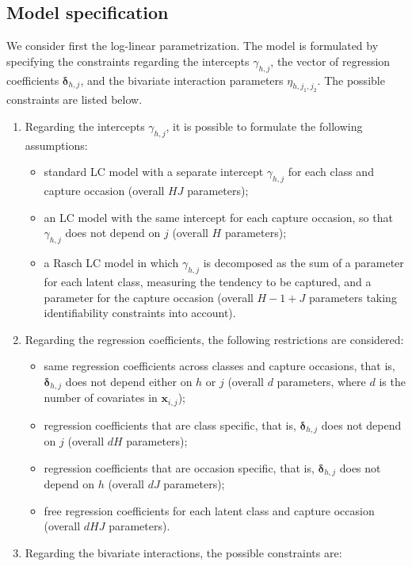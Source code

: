 \subsection{Model specification}
%
We consider first the log-linear parametrization.
The model is formulated by specifying the constraints regarding the intercepts $\gamma_{h,j}$, the vector of regression coefficients $\bm{\delta}_{h,j}$, and the bivariate interaction parameters $\eta_{h,j_1,j_2}$.
The possible constraints are listed below.
%
\begin{enumerate}
%
\item Regarding the intercepts $\gamma_{h,j}$, it is possible to formulate the following assumptions:
%
\begin{itemize}
%
\item standard LC model with a separate intercept $\gamma_{h,j}$ for each class and capture occasion (overall $HJ$ parameters);
%
\item an LC model with the same intercept for each capture occasion, so that $\gamma_{h,j}$ does not depend on $j$ (overall $H$ parameters);
%
\item a Rasch LC model in which $\gamma_{h,j}$ is decomposed as the sum of a parameter for each latent class, measuring the tendency to be captured, and a parameter for the capture occasion (overall $H-1+J$ parameters taking identifiability constraints into account).
%
\end{itemize}
%
\item Regarding the regression coefficients, the following restrictions are considered:
%
\begin{itemize}
%
\item same regression coefficients across classes and capture occasions, that is, $\bm{\delta}_{h,j}$ does not depend either on $h$ or $j$ (overall $d$ parameters, where $d$ is the number of covariates in $\bm{x}_{i,j}$);
%
\item regression coefficients that are class specific, that is, $\bm{\delta}_{h,j}$ does not depend on $j$ (overall $dH$ parameters);
%
\item regression coefficients that are occasion specific, that is, $\bm{\delta}_{h,j}$ does not depend on $h$ (overall $dJ$ parameters);
%
\item free regression coefficients for each latent class and capture occasion (overall $dHJ$ parameters).
%
\end{itemize}
%
\item Regarding the bivariate interactions, the possible constraints are:

\end{enumerate}
